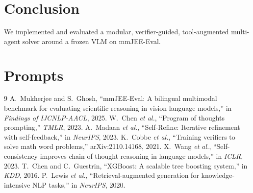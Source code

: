 \documentclass[conference]{IEEEtran}
\begin{document}
\section{Conclusion}
We implemented and evaluated a modular, verifier-guided, tool-augmented
multi-agent solver around a frozen VLM on mmJEE-Eval.

\appendix
\section{Prompts}


\begin{thebibliography}{9}
 A.~Mukherjee and S.~Ghosh, ``mmJEE-Eval: A bilingual multimodal
benchmark for evaluating scientific reasoning in vision-language models,'' in
\emph{Findings of IJCNLP-AACL}, 2025.
 W.~Chen \emph{et al.}, ``Program of thoughts prompting,''
\emph{TMLR}, 2023.
 A.~Madaan \emph{et al.}, ``Self-Refine: Iterative refinement
with self-feedback,'' in \emph{NeurIPS}, 2023.
 K.~Cobbe \emph{et al.}, ``Training verifiers to solve math word
problems,'' arXiv:2110.14168, 2021.
 X.~Wang \emph{et al.}, ``Self-consistency improves chain
of thought reasoning in language models,'' in \emph{ICLR}, 2023.
 T.~Chen and C.~Guestrin, ``XGBoost: A scalable tree boosting
system,'' in \emph{KDD}, 2016.
 P.~Lewis \emph{et al.}, ``Retrieval-augmented generation for
knowledge-intensive NLP tasks,'' in \emph{NeurIPS}, 2020.
\end{thebibliography}
\end{document}
